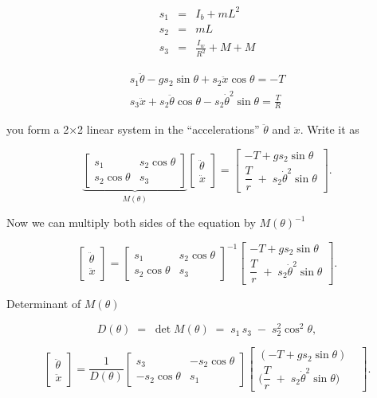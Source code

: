 \documentclass[]{article}
\begin{document}
\begin{eqnarray*}
s_1 & = & I_b + m L^2  \\
s_2 & = & m L \\
s_3 & = & \frac{I_w}{R^2} + M + M
\end{eqnarray*}

\begin{eqnarray*}
s_1 \ddot{\theta} - g s_2 \sin \theta + s_2 \ddot{x} \cos \theta = - T  \\
s_3 \ddot{x} + s_2 \ddot{\theta} \cos \theta - s_2 \dot{\theta}^2 \sin \theta = \frac{T}{R}
\end{eqnarray*}

you form a 2×2 linear system in the “accelerations” $\ddot\theta$ and $\ddot x$.  Write it as

$$
\underbrace{\begin{bmatrix}
s_1 & s_2  \cos \theta  \\
s_2 \cos \theta & s_3
\end{bmatrix}}_{M(\theta)}
\begin{bmatrix}\ddot\theta\\[3pt]\ddot x\end{bmatrix}
=
\begin{bmatrix}
-T + g s_2 \sin \theta \\[6pt]
\dfrac{T}{r} \; + \;s_2 \dot{\theta}^2 \sin \theta 
\end{bmatrix}.
$$

Now we can multiply both sides of the equation by $M(\theta)^{-1}$

$$
\begin{bmatrix}\ddot\theta\\[3pt]\ddot x\end{bmatrix}
=
\begin{bmatrix}
s_1 & s_2  \cos \theta  \\
s_2 \cos \theta & s_3
\end{bmatrix}
^{-1}
\begin{bmatrix}
-T + g s_2 \sin \theta \\[6pt]
\dfrac{T}{r} \; + \;s_2 \dot{\theta}^2 \sin \theta 
\end{bmatrix}.
$$


Determinant of $M(\theta)$

$$
D(\theta) \;=\;\det M(\theta)\;=\;s_1\,s_3 \;-\;s_2^2\cos^2\theta,
$$

$$
\begin{bmatrix}\ddot\theta\\[3pt]\ddot x\end{bmatrix}
= \frac{1}{D(\theta)}
\begin{bmatrix}
s_3 & -s_2  \cos \theta  \\
-s_2 \cos \theta & s_1
\end{bmatrix}
\begin{bmatrix}
(-T + g s_2 \sin \theta) &  \\[6pt]
\Big(\dfrac{T}{r} \; + \;s_2 \dot{\theta}^2 \sin \theta \Big)
\end{bmatrix}.
$$
\end{document}
